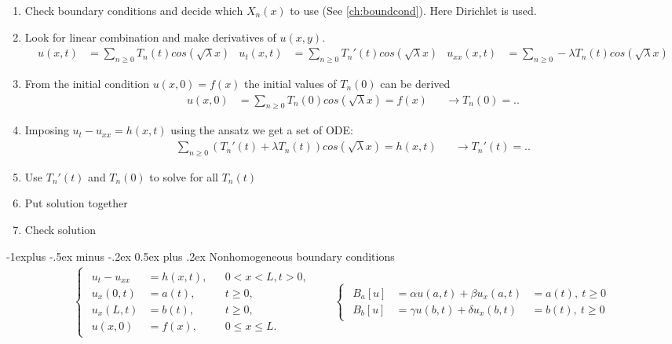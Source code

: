 \documentclass[10pt,landscape]{article}
\makeatletter
\renewcommand{\subsection}{\@startsection{subsection}{2}{0mm}%
                                {-1explus -.5ex minus -.2ex}%
                                {0.5ex plus .2ex}%
                                {\normalfont\normalsize\bfseries}}
\makeatother
\begin{document}
\begin{multicols*}{2}
  \begin{enumerate}
    \item Check boundary conditions and decide which $X_n(x)$ to use (See \ref{ch:boundcond}). Here Dirichlet is used.
    \item Look for linear combination and make derivatives of $u(x,y)$.
      \begin{align*}
        u(x,t) &= \sum_{n\geq0} T_n(t)cos(\sqrt{\lambda}x) & u_t(x,t) &= \sum_{n\geq0} T_n'(t)cos(\sqrt{\lambda}x) & u_{xx}(x,t) &= \sum_{n\geq0} -\lambda T_n(t)cos(\sqrt{\lambda}x)
      \end{align*}
    \item From the initial condition $u(x,0)=f(x)$ the initial values of $T_n(0)$ can be derived
      \begin{align*}
        u(x,0) &= \sum_{n\geq0} T_n(0)cos(\sqrt{\lambda}x) = f(x) & &\longrightarrow T_n(0)=..
      \end{align*}
    \item Imposing $u_t-u_{xx} = h(x,t)$ using the ansatz we get a set of ODE:
      \begin{align*}
        \sum_{n\geq0} (T_n'(t)+\lambda T_n(t) ) cos(\sqrt{\lambda}x) = h(x,t) & &\longrightarrow T_n'(t)=..
      \end{align*}
    \item Use $T_n'(t)$ and $T_n(0)$ to solve for all $T_n(t)$
    \item Put solution together
    \item Check solution
  \end{enumerate}

\subsection{Nonhomogeneous boundary conditions}
  \begin{align*}
    \begin{cases}
      \begin{aligned}
        u_t - u_{xx} &= h(x,t), & &0<x<L, t>0,\\
        u_x(0,t) &= a(t),     & &t\geq0,\\
        u_x(L,t) &= b(t),     & &t\geq0,\\
        u(x,0)  &= f(x),          & &0\leq x\leq L.
      \end{aligned}
    \end{cases}
    &&
    \begin{cases}
      \begin{aligned}
        B_a[u]&=\alpha u(a,t)+\beta  u_x(a,t)&=a(t),\ t\geq0 \\ 
        B_b[u]&=\gamma u(b,t)+\delta u_x(b,t)&=b(t),\ t\geq0
      \end{aligned}
    \end{cases}
  \end{align*}


\end{multicols*}
\end{document}
